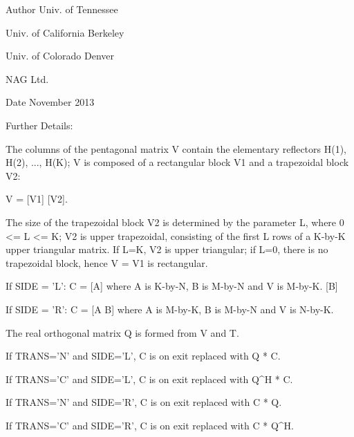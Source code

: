 \begin{DoxyAuthor}{Author}
Univ. of Tennessee 

Univ. of California Berkeley 

Univ. of Colorado Denver 

N\+A\+G Ltd. 
\end{DoxyAuthor}
\begin{DoxyDate}{Date}
November 2013 
\end{DoxyDate}
\begin{DoxyParagraph}{Further Details\+: }
\begin{DoxyVerb}  The columns of the pentagonal matrix V contain the elementary reflectors
  H(1), H(2), ..., H(K); V is composed of a rectangular block V1 and a 
  trapezoidal block V2:

        V = [V1]
            [V2].

  The size of the trapezoidal block V2 is determined by the parameter L, 
  where 0 <= L <= K; V2 is upper trapezoidal, consisting of the first L
  rows of a K-by-K upper triangular matrix.  If L=K, V2 is upper triangular;
  if L=0, there is no trapezoidal block, hence V = V1 is rectangular.

  If SIDE = 'L':  C = [A]  where A is K-by-N,  B is M-by-N and V is M-by-K. 
                      [B]   
  
  If SIDE = 'R':  C = [A B]  where A is M-by-K, B is M-by-N and V is N-by-K.

  The real orthogonal matrix Q is formed from V and T.

  If TRANS='N' and SIDE='L', C is on exit replaced with Q * C.

  If TRANS='C' and SIDE='L', C is on exit replaced with Q^H * C.

  If TRANS='N' and SIDE='R', C is on exit replaced with C * Q.

  If TRANS='C' and SIDE='R', C is on exit replaced with C * Q^H.\end{DoxyVerb}
 
\end{DoxyParagraph}
